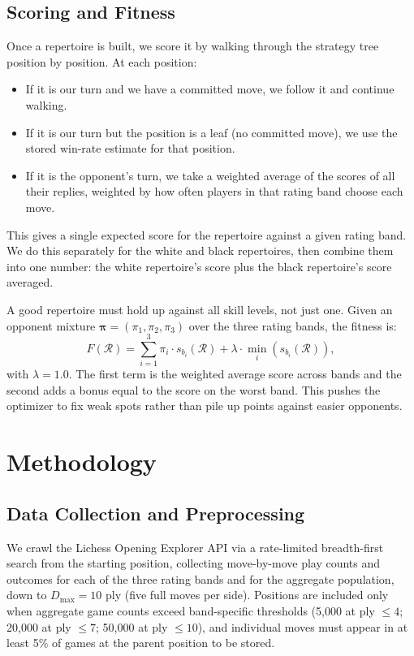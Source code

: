 \documentclass[conference]{IEEEtran}
\begin{document}
\subsection{Scoring and Fitness}

Once a repertoire is built, we score it by walking through the strategy tree position by position. At each position:
\begin{itemize}
    \item If it is our turn and we have a committed move, we follow it and continue walking.
    \item If it is our turn but the position is a leaf (no committed move), we use the stored win-rate estimate for that position.
    \item If it is the opponent's turn, we take a weighted average of the scores of all their replies, weighted by how often players in that rating band choose each move.
\end{itemize}
This gives a single expected score for the repertoire against a given rating band. We do this separately for the white and black repertoires, then combine them into one number: the white repertoire's score plus the black repertoire's score averaged.

A good repertoire must hold up against all skill levels, not just one. Given an opponent mixture $\boldsymbol{\pi} = (\pi_1, \pi_2, \pi_3)$ over the three rating bands, the fitness is:
\begin{equation}
F(\mathcal{R}) = \sum_{i=1}^{3} \pi_i \cdot s_{b_i}(\mathcal{R}) + \lambda \cdot \min_i ( s_{b_i}(\mathcal{R})),
\end{equation}
with $\lambda = 1.0$. The first term is the weighted average score across bands and the second adds a bonus equal to the score on the worst band. This pushes the optimizer to fix weak spots rather than pile up points against easier opponents.


\section{Methodology}

\subsection{Data Collection and Preprocessing}

We crawl the Lichess Opening Explorer API \cite{lichess} via a
rate-limited breadth-first search from the starting position, collecting
move-by-move play counts and outcomes for each of the three rating bands
and for the aggregate population, down to $D_{\max} = 10$ ply (five full
moves per side). Positions are included only when aggregate game counts
exceed band-specific thresholds (5,000 at ply $\leq 4$; 20,000 at
ply $\leq 7$; 50,000 at ply $\leq 10$), and individual moves must appear
in at least 5\% of games at the parent position to be stored.
\end{document}
